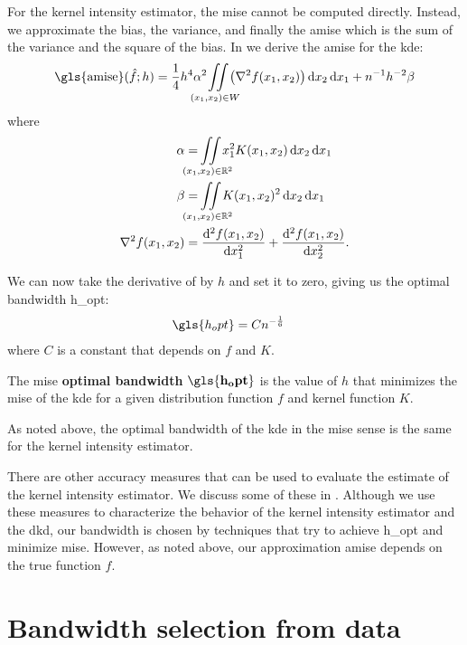 For the \gls{kernel intensity estimator},
the \gls{mise} cannot be computed directly.
Instead,
we approximate the bias,
the variance,
and finally the \gls{amise} which is the sum of the variance and the square of the bias.
In  we derive the \gls{amise}
for the \gls{kde}:
\begin{equation}
    \label{eq:amise}
    \mbox{\gls{amise}}(\hat{f}; h) = 
        \frac{1}{4} h^{4} \alpha^2 \iintW{\left( \nabla^2 f \xvec \right) } +
        n^{-1} h^{-2} \beta
\end{equation}
where
\begin{align}
    \alpha & = \iintR{x_1^2 K(x_1,x_2)} \\
    \beta & = \iintR{K(x_1,x_2)^2} \\
    \nabla^2 f \xvec & = \frac{\diffsq{f}\xvec}{\diff{x_1^2}} + \frac{\diffsq{f}\xvec}{\diff{x_2^2}} \text{.}
\end{align}

We can now take the derivative of  by $h$ and set it to zero,
giving us the optimal bandwidth \gls{h_opt}:
\begin{align}
    \gls{h_opt} & = C n^{-\frac{1}{6}}
\end{align}
where $C$ is a constant that depends on $f$ and $K$.
\begin{defn}
    The \gls{mise} \textbf{optimal bandwidth} $\mathbf{\gls{h_opt}}$ is the value of $h$ that minimizes the \gls{mise} of the \gls{kde} for a given distribution function $f$ and kernel function $K$.
\end{defn}
As noted above,
the optimal bandwidth of the \gls{kde} in the \gls{mise} sense is the same for the \gls{kernel intensity estimator}.

There are other accuracy measures that can be used to evaluate the estimate of the \gls{kernel intensity estimator}.
We discuss some of these in .
Although we use these measures to characterize the behavior of the \gls{kernel intensity estimator} and the \gls{dkd},
our bandwidth is chosen by techniques that try to achieve \gls{h_opt} and minimize \gls{mise}.
However, as noted above,
our approximation \gls{amise} depends on the true function $f$.


\section{Bandwidth selection from data}
\label{sec:theory:bandwidthselection}

